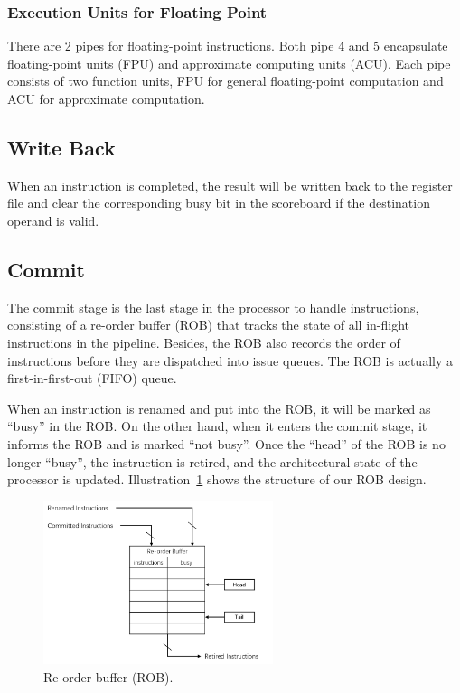 \subsubsection{Execution Units for Floating Point} %
There are 2 pipes for floating-point instructions. Both pipe 4 and 5 encapsulate floating-point units (FPU) and approximate computing units (ACU). Each pipe consists of two function units, FPU for general floating-point computation and ACU for approximate computation.

\subsection{Write Back} %

When an instruction is completed, the result will be written back to the register file and clear the corresponding busy bit in the scoreboard if the destination operand is valid.

\subsection{Commit} %
The commit stage is the last stage in the processor to handle instructions, consisting of a re-order buffer (ROB) that tracks the state of all in-flight instructions in the pipeline. Besides, the ROB also records the order of instructions before they are dispatched into issue queues. The ROB is actually a first-in-first-out (FIFO) queue.

When an instruction is renamed and put into the ROB, it will be marked as ``busy'' in the ROB. On the other hand, when it enters the commit stage, it informs the ROB and is marked ``not busy''. Once the ``head'' of the ROB is no longer ``busy'', the instruction is retired, and the architectural state of the processor is updated. Illustration~\ref{fig:rob} shows the structure of our ROB design.

\begin{figure}[!htp]
    \centering
    \includegraphics[width=0.6\textwidth]{figure/rob.png}
    \caption{Re-order buffer (ROB).}
    \label{fig:rob}
\end{figure}

